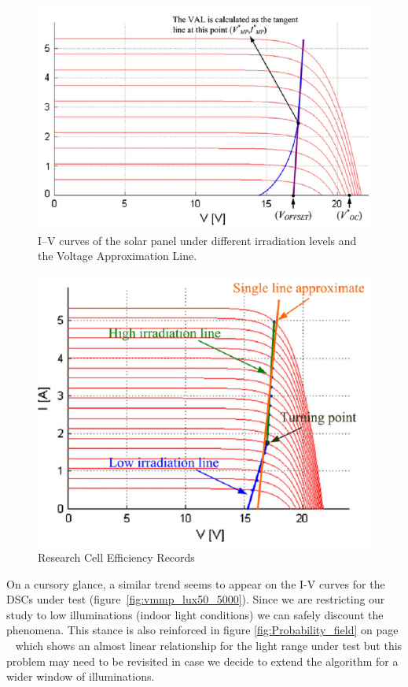   \begin{figure}[H]
   \begin{center}
   \includegraphics[width=\textwidth]{images/IVCurve_lui}
   \caption{I–V curves of the solar panel under different irradiation levels and the Voltage Approximation Line. \cite{liu2011fast} }
   \label{fig:Lui_IV_1}
   \end{center}
   \end{figure}
   
\begin{figure}[H]
    \begin{center}
         \includegraphics[height=0.4\textheight]{images/IVCurve_lui_2}
         \caption{Research Cell Efficiency Records \cite{liu2011fast} }
         \label{fig:Lui_IV_2}
    \end{center}
\end{figure}
On a cursory glance, a similar trend seems to appear on the I-V curves for the \ac{DSCs} under test (figure~\ref{fig:vmmp_lux50_5000}). Since we are restricting our study to low illuminations (indoor light conditions) we can safely discount the phenomena. This stance is also reinforced in figure \ref{fig:Probability_field} on page ~\pageref{fig:Probability_field} which shows an almost linear relationship for the light range under test but this problem may need to be revisited in case we decide to extend the algorithm for a wider window of illuminations.        
   
